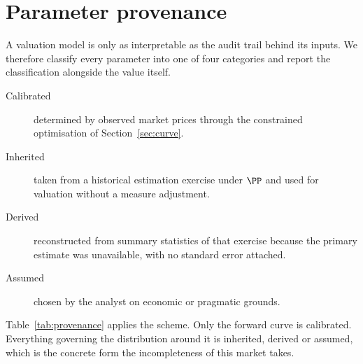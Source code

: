 \section{Parameter provenance}
\label{sec:provenance}

A valuation model is only as interpretable as the audit trail behind its
inputs. We therefore classify every parameter into one of four categories and
report the classification alongside the value itself.

\begin{description}
\item[Calibrated] determined by observed market prices through the constrained
  optimisation of Section~\ref{sec:curve}.
\item[Inherited] taken from a historical estimation exercise under $\PP$ and
  used for valuation without a measure adjustment.
\item[Derived] reconstructed from summary statistics of that exercise because
  the primary estimate was unavailable, with no standard error attached.
\item[Assumed] chosen by the analyst on economic or pragmatic grounds.
\end{description}

Table~\ref{tab:provenance} applies the scheme. Only the forward curve is
calibrated. Everything governing the distribution around it is inherited,
derived or assumed, which is the concrete form the incompleteness of this
market takes.

